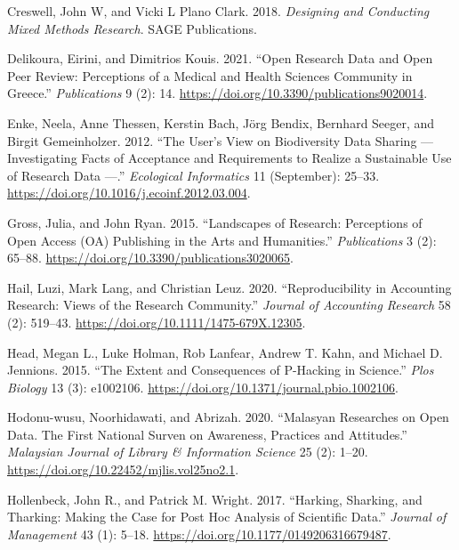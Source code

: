 \documentclass[
  letterpaper,
  DIV=11,
  numbers=noendperiod]{scrartcl}
\newlength{\cslhangindent}
\newlength{\cslentryspacingunit} %
\newenvironment{CSLReferences}[2] %
 {%
  \setlength{\parindent}{0pt}
  \ifodd #1
  \let\oldpar\par
  \def\par{\hangindent=\cslhangindent\oldpar}
  \fi
  \setlength{\parskip}{#2\cslentryspacingunit}
 }%
 {}
\begin{document}
\begin{CSLReferences}{1}{0}
\leavevmode{}%
Creswell, John W, and Vicki L Plano Clark. 2018. \emph{Designing and
{Conducting Mixed Methods Research}}. SAGE Publications.

\leavevmode{}%
Delikoura, Eirini, and Dimitrios Kouis. 2021. {``Open {Research Data}
and {Open Peer Review}: {Perceptions} of a {Medical} and {Health
Sciences Community} in {Greece}.''} \emph{Publications} 9 (2): 14.
\url{https://doi.org/10.3390/publications9020014}.

\leavevmode{}%
Enke, Neela, Anne Thessen, Kerstin Bach, Jörg Bendix, Bernhard Seeger,
and Birgit Gemeinholzer. 2012. {``The User's View on Biodiversity Data
Sharing --- {Investigating} Facts of Acceptance and Requirements to
Realize a Sustainable Use of Research Data ---.''} \emph{Ecological
Informatics} 11 (September): 25--33.
\url{https://doi.org/10.1016/j.ecoinf.2012.03.004}.

\leavevmode{}%
Gross, Julia, and John Ryan. 2015. {``Landscapes of {Research}:
{Perceptions} of {Open Access} ({OA}) {Publishing} in the {Arts} and
{Humanities}.''} \emph{Publications} 3 (2): 65--88.
\url{https://doi.org/10.3390/publications3020065}.

\leavevmode{}%
Hail, Luzi, Mark Lang, and Christian Leuz. 2020. {``Reproducibility in
{Accounting Research}: {Views} of the {Research Community}.''}
\emph{Journal of Accounting Research} 58 (2): 519--43.
\url{https://doi.org/10.1111/1475-679X.12305}.

\leavevmode{}%
Head, Megan L., Luke Holman, Rob Lanfear, Andrew T. Kahn, and Michael D.
Jennions. 2015. {``The {Extent} and {Consequences} of {P-Hacking} in
{Science}.''} \emph{Plos Biology} 13 (3): e1002106.
\url{https://doi.org/10.1371/journal.pbio.1002106}.

\leavevmode{}%
Hodonu-wusu, Noorhidawati, and Abrizah. 2020. {``Malasyan Researches on
Open Data. {The} First National Surven on Awareness, Practices and
Attitudes.''} \emph{Malaysian Journal of Library \& Information Science}
25 (2): 1--20. \url{https://doi.org/10.22452/mjlis.vol25no2.1}.

\leavevmode{}%
Hollenbeck, John R., and Patrick M. Wright. 2017. {``Harking,
{Sharking}, and {Tharking}: {Making} the {Case} for {Post Hoc Analysis}
of {Scientific Data}.''} \emph{Journal of Management} 43 (1): 5--18.
\url{https://doi.org/10.1177/0149206316679487}.


\end{CSLReferences}
\end{document}
